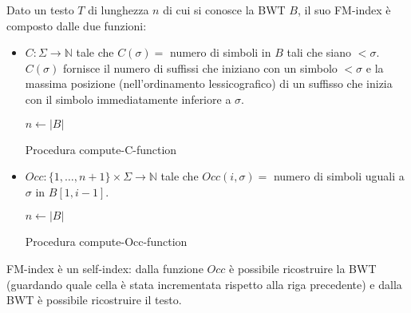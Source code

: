 Dato un testo $T$ di lunghezza $n$ di cui si conosce la BWT $B$, il suo FM-index è composto dalle due funzioni:
\begin{itemize}
    \item $C : \Sigma \to \mathbb{N}$ tale che $C(\sigma) = $ numero di simboli in $B$ tali che siano $< \sigma$.
    $C(\sigma)$ fornisce il numero di suffissi che iniziano con un simbolo $< \sigma$ e la massima posizione (nell’ordinamento lessicografico) di un suffisso che inizia con il simbolo immediatamente inferiore a $\sigma$.\\
        \begin{algorithm}[H]
        \SetAlgoLined
            $n \leftarrow |B|$\;
            \caption{Procedura compute-C-function}
        \end{algorithm}
    \item $Occ : \{1, \dots, n+1\} \times \Sigma \to \mathbb{N}$ tale che $Occ(i,\sigma) =$ numero di simboli uguali a $\sigma$ in $B[1, i-1 ]$.\\
        \begin{algorithm}[H]
        \SetAlgoLined
            $n \leftarrow |B|$\;
            \caption{Procedura compute-Occ-function}
        \end{algorithm}
\end{itemize}
FM-index è un self-index: dalla funzione $Occ$ è possibile ricostruire la BWT (guardando quale cella è stata incrementata rispetto alla riga precedente) e dalla BWT è possibile ricostruire il testo.